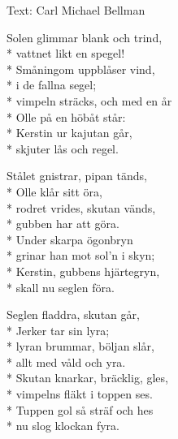 \begin{SongText}
    \begin{SongInfo}
        Text: Carl Michael Bellman
    \end{SongInfo}
    \begin{SongVerse}
        Solen glimmar blank och trind,\\*%
        vattnet likt en spegel!\\*%
        Småningom uppblåser vind,\\*%
        i de fallna segel;\\*%
        vimpeln sträcks, och med en år\\*%
        Olle på en höbåt står:\\*%
        Kerstin ur kajutan går,\\*%
        skjuter lås och regel.
    \end{SongVerse}
    \begin{SongVerse}
        Stålet gnistrar, pipan tänds,\\*%
        Olle klår sitt öra,\\*%
        rodret vrides, skutan vänds,\\*%
        gubben har att göra.\\*%
        Under skarpa ögonbryn\\*%
        grinar han mot sol’n i skyn;\\*%
        Kerstin, gubbens hjärtegryn,\\*%
        skall nu seglen föra.
    \end{SongVerse}
    \begin{SongVerse}
        Seglen fladdra, skutan går,\\*%
        Jerker tar sin lyra;\\*%
        lyran brummar, böljan slår,\\*%
        allt med våld och yra.\\*%
        Skutan knarkar, bräcklig, gles,\\*%
        vimpelns fläkt i toppen ses.\\*%
        Tuppen gol så sträf och hes\\*%
        nu slog klockan fyra. 
    \end{SongVerse}
\end{SongText}